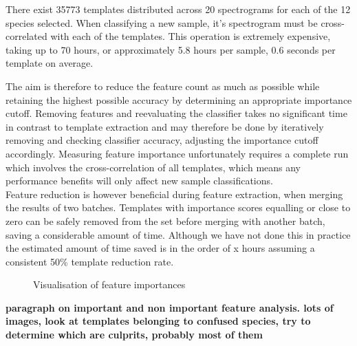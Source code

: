 There exist 35773 templates distributed across 20 spectrograms for each
of the 12 species selected.
When classifying a new sample, it's spectrogram must be cross-correlated with
each of the templates.
This operation is extremely expensive, taking up to 70 hours, or approximately
5.8 hours per sample, 0.6 seconds per template on average.

The aim is therefore to reduce the feature count as much as possible while
retaining the highest possible accuracy by determining an appropriate importance
cutoff.
Removing features and reevaluating the classifier takes no significant time in
contrast to template extraction and may therefore be done by iteratively removing
and checking classifier accuracy, adjusting the importance cutoff accordingly.
Measuring feature importance unfortunately requires a complete run which involves
the cross-correlation of all templates, which means any performance benefits will
only affect new sample classifications.\\

Feature reduction is however beneficial during feature extraction, when merging
the results of two batches.
Templates with importance scores equalling or close to zero can be safely removed
from the set before merging with another batch, saving a considerable amount of time.
Although we have not done this in practice the estimated amount of time saved is
in the order of x hours assuming a consistent 50\% template reduction rate.

\begin{figure}[!htb]
  \centering
  \caption{Visualisation of feature importances}
  \label{fig:fimp}
\end{figure}


\textbf{paragraph on important and non important feature analysis. lots of 
images, look at templates belonging to confused species, try to determine
which are culprits, probably most of them}
